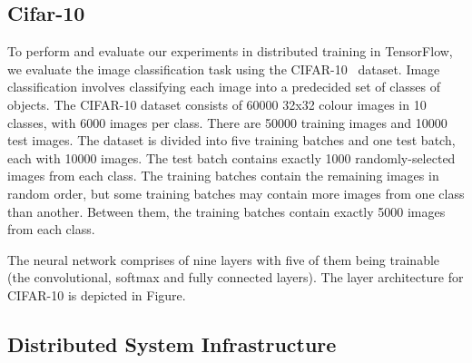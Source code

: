 \subsection{Cifar-10}
To perform and evaluate our experiments in distributed training in TensorFlow, we evaluate the image classification task using the CIFAR-10~\cite{cifar10} dataset. Image classification involves classifying each image into a predecided set of classes of objects. The CIFAR-10 dataset consists of 60000 32x32 colour images in 10 classes, with 6000 images per class. There are 50000 training images and 10000 test images. The dataset is divided into five training batches and one test batch, each with 10000 images. The test batch contains exactly 1000 randomly-selected images from each class. The training batches contain the remaining images in random order, but some training batches may contain more images from one class than another. Between them, the training batches contain exactly 5000 images from each class. 

The neural network comprises of nine layers with five of them being trainable (the convolutional, softmax and fully connected layers). The layer architecture for CIFAR-10 is depicted in Figure. 

\subsection{Distributed System Infrastructure}
